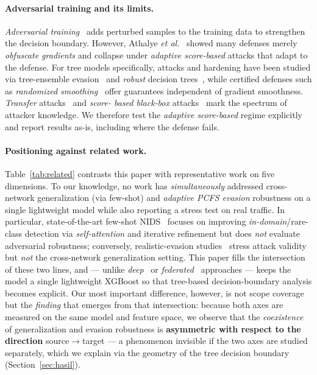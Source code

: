 \documentclass[preprint,12pt,authoryear]{elsarticle}
\begin{document}
\paragraph{Adversarial training and its limits.} \emph{Adversarial
training}~\citep{goodfellow2015,madry2018} adds perturbed samples to the training
data to strengthen the decision boundary. However, Athalye \emph{et
al.}~\citep{athalye2018} showed many defenses merely \emph{obfuscate gradients} and
collapse under \emph{adaptive score-based} attacks that adapt to the defense. For tree
models specifically, attacks and hardening have been studied via tree-ensemble
evasion~\citep{kantchelian2016} and \emph{robust} decision
trees~\citep{chen2019robusttrees}, while certified defenses such as \emph{randomized
smoothing}~\citep{cohen2019smoothing} offer guarantees independent of gradient
smoothness. \emph{Transfer} attacks~\citep{papernot2016transfer} and \emph{score-
based black-box} attacks~\citep{ilyas2018blackbox} mark the spectrum of attacker
knowledge. We therefore test the \emph{adaptive score-based} regime explicitly and
report results as-is, including where the defense fails.

\paragraph{Positioning against related work.} Table~\ref{tab:related} contrasts this
paper with representative work on five dimensions. To our knowledge, no work has
\emph{simultaneously} addressed cross-network generalization (via few-shot) and
\emph{adaptive PCFS evasion} robustness on a single lightweight model while also
reporting a stress test on real traffic. In particular, state-of-the-art few-shot
NIDS~\citep{fewshot} focuses on improving \emph{in-domain}/rare-class detection via
\emph{self-attention} and iterative refinement but does \emph{not} evaluate
adversarial robustness; conversely, realistic-evasion
studies~\citep{apruzzese2023,merzouk2022,sheatsley2022} stress attack validity but
\emph{not} the cross-network generalization setting. This paper fills the
intersection of these two lines, and --- unlike \emph{deep}~\citep{wu,duan} or
\emph{federated}~\citep{popoola,bertoli} approaches --- keeps the model a single
lightweight XGBoost so that tree-based decision-boundary analysis becomes explicit.
Our most important difference, however, is not scope coverage but the \emph{finding}
that emerges from that intersection: because both axes are measured on the same
model and feature space, we observe that the \emph{coexistence} of generalization
and evasion robustness is \textbf{asymmetric with respect to the direction}
source$\rightarrow$target --- a phenomenon invisible if the two axes are studied
separately, which we explain via the geometry of the tree decision boundary
(Section~\ref{sec:hasil}).
\end{document}
